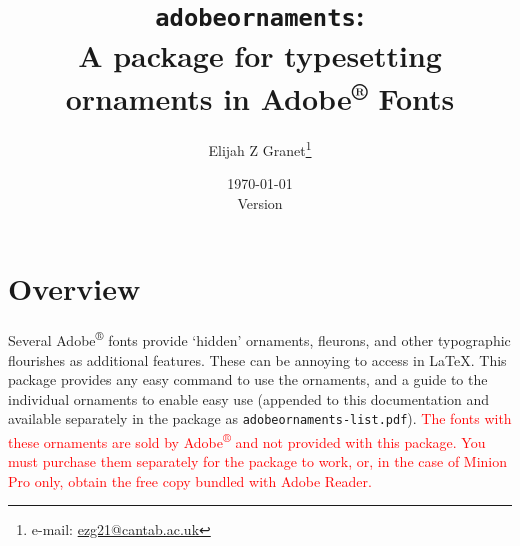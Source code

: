 \documentclass[12pt]{article}
\date{\today\\\smallskip\ttfamily Version \adobeornamentsversionnumber}
\author{Elijah Z Granet\thanks{e-mail: \href{mailto:ezg21@cantab.ac.uk}{\ttfamily ezg21@cantab.ac.uk}}}
\title{\texttt{adobeornaments}:\\A package for typesetting ornaments in Adobe\textsuperscript{®️} Fonts}
\begin{document}
\maketitle
\tableofcontents
\clearpage
\section{Overview}
Several Adobe\textsuperscript{®️} fonts provide `hidden' ornaments, fleurons, and other typographic flourishes as additional features. These can be annoying to access in \LaTeX. This package provides any easy command to use the ornaments, and a guide to the individual ornaments to enable easy use (appended to this documentation and available separately in the package as \texttt{adobeornaments-list.pdf}).  \textcolor{red}{The fonts with these ornaments are sold by Adobe\textsuperscript{®️} and not provided with this package. You must purchase them separately for the package to work, or, in the case of Minion Pro only, obtain the free copy bundled with Adobe Reader.}
\end{document}
